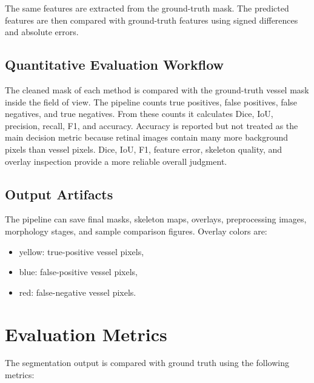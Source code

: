 \documentclass[12pt,a4paper]{article}
\begin{document}
The same features are extracted from the ground-truth mask. The predicted features are then compared with ground-truth features using signed differences and absolute errors.

\subsection{Quantitative Evaluation Workflow}
The cleaned mask of each method is compared with the ground-truth vessel mask inside the field of view. The pipeline counts true positives, false positives, false negatives, and true negatives. From these counts it calculates Dice, IoU, precision, recall, F1, and accuracy. Accuracy is reported but not treated as the main decision metric because retinal images contain many more background pixels than vessel pixels. Dice, IoU, F1, feature error, skeleton quality, and overlay inspection provide a more reliable overall judgment.

\subsection{Output Artifacts}
The pipeline can save final masks, skeleton maps, overlays, preprocessing images, morphology stages, and sample comparison figures. Overlay colors are:
\begin{itemize}
    \item yellow: true-positive vessel pixels,
    \item blue: false-positive vessel pixels,
    \item red: false-negative vessel pixels.
\end{itemize}

\section{Evaluation Metrics}
The segmentation output is compared with ground truth using the following metrics:
\end{document}

